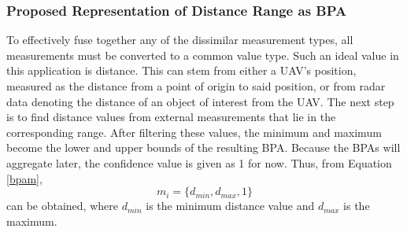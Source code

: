 \documentclass[12pt]{uthesis-v12}  %
\begin{document}
\subsubsection{Proposed Representation of Distance Range as BPA}
\label{bpa}

To effectively fuse together any of the dissimilar measurement types, all measurements must be converted to a common value type. Such an ideal value in this application is distance. This can stem from either a UAV's position, measured as the distance from a point of origin to said position, or from radar data denoting the distance of an object of interest from the UAV. The next step is to find distance values from external measurements that lie in the corresponding range. After filtering these values, the minimum and maximum become the lower and upper bounds of the resulting BPA. Because the BPAs will aggregate later, the confidence value is given as 1 for now. Thus, from Equation \ref{bpam},
\begin{equation}
m_i = \{ d_{min}, d_{max}, 1 \}
\label{bpa-d}
\end{equation}
can be obtained, where $d_{min}$ is the minimum distance value and $d_{max}$ is the maximum.
\end{document}
